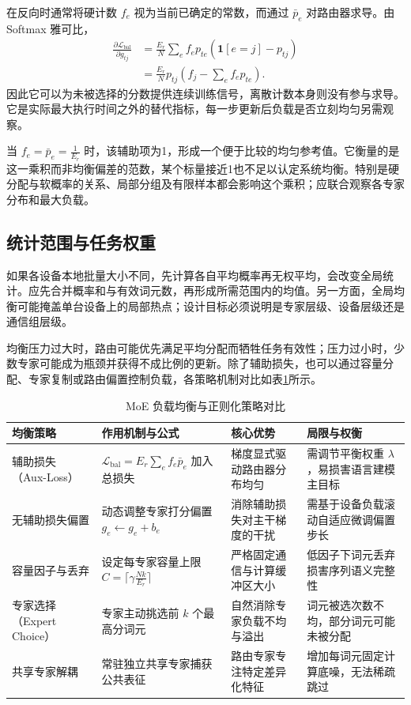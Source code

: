 \documentclass[../textbook.tex]{subfiles}
\begin{document}
在反向时通常将硬计数 $f_e$ 视为当前已确定的常数，而通过 $\bar p_e$ 对路由器求导。由 Softmax 雅可比，
\begin{align}
 \frac{\partial\mathcal L_{\mathrm{bal}}}{\partial g_{tj}}
 &=\frac{E_r}{N}\sum_ef_ep_{te}(\mathbf1[e=j]-p_{tj})\\
 &=\frac{E_r}{N}p_{tj}\left(f_j-\sum_ef_ep_{te}\right).
 \label{eq:moe-balance-grad}
\end{align}
因此它可以为未被选择的分数提供连续训练信号，离散计数本身则没有参与求导。它是实际最大执行时间之外的替代指标，每一步更新后负载是否立刻均匀另需观察。

当 $f_e=\bar p_e=\frac{1}{E_r}$ 时，该辅助项为1，形成一个便于比较的均匀参考值。它衡量的是这一乘积而非均衡偏差的范数，某个标量接近1也不足以认定系统均衡。特别是硬分配与软概率的关系、局部分组及有限样本都会影响这个乘积；应联合观察各专家分布和最大负载。

\subsection{统计范围与任务权重}
如果各设备本地批量大小不同，先计算各自平均概率再无权平均，会改变全局统计。应先合并概率和与有效词元数，再形成所需范围内的均值。另一方面，全局均衡可能掩盖单台设备上的局部热点；设计目标必须说明是专家层级、设备层级还是通信组层级。

均衡压力过大时，路由可能优先满足平均分配而牺牲任务有效性；压力过小时，少数专家可能成为瓶颈并获得不成比例的更新。除了辅助损失，也可以通过容量分配、专家复制或路由偏置控制负载，各策略机制对比如表\ref{tab:moe-balance-strategies}所示。

\begin{table}[htbp]
\centering
\caption{MoE 负载均衡与正则化策略对比}\label{tab:moe-balance-strategies}
\begin{tabularx}{\linewidth}{lXXX}
\toprule
均衡策略 & 作用机制与公式 & 核心优势 & 局限与权衡\\\midrule
辅助损失（Aux-Loss） & $\mathcal{L}_{\mathrm{bal}} = E_r \sum_e f_e \bar{p}_e$ 加入总损失 & 梯度显式驱动路由器分布均匀 & 需调节平衡权重 $\lambda$，易损害语言建模主目标\\
无辅助损失偏置 & 动态调整专家打分偏置 $g_e \gets g_e + b_e$ & 消除辅助损失对主干梯度的干扰 & 需基于设备负载滚动自适应微调偏置步长\\
容量因子与丢弃 & 设定每专家容量上限 $C = \lceil\gamma \frac{Nk}{E_r}\rceil$ & 严格固定通信与计算缓冲区大小 & 低因子下词元丢弃损害序列语义完整性\\
专家选择（Expert Choice） & 专家主动挑选前 $k$ 个最高分词元 & 自然消除专家负载不均与溢出 & 词元被选次数不均，部分词元可能未被分配\\
共享专家解耦 & 常驻独立共享专家捕获公共表征 & 路由专家专注特定差异化特征 & 增加每词元固定计算底噪，无法稀疏跳过\\
\bottomrule
\end{tabularx}
\end{table}
\end{document}

